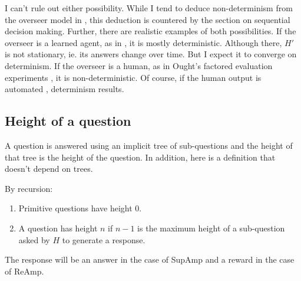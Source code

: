 \documentclass{farlamp}
\begin{document}
I can't rule out either possibility. While I tend to deduce non-determinism from
the overseer model in \textcite{ChriRelAmp}, this deduction is countered by the
section on sequential decision making. Further, there are realistic examples of
both possibilities. If the overseer is a learned agent, as in
\textcite{CSASupAmp}, it is mostly deterministic. Although there, $H'$ is not
stationary, ie. its answers change over time. But I expect it to converge on
determinism. If the overseer is a human, as in Ought's factored evaluation
experiments \parencite{StuhDelCog}, it is non-deterministic. Of course, if the
human output is automated \parencite[see][sec. ‘Caching’ f.]{StuhTaxCapAmp},
determinism results.

%
%
%
%


\subsection{Height of a question}

A question is answered using an implicit tree of sub-questions and the height of
that tree is the height of the question. In addition, here is a definition that
doesn't depend on trees.

\begin{definition} By recursion:
    \begin{enumerate}
    \item Primitive questions have height 0.
    \item A question has height $n$ if $n-1$ is the maximum height of a
        sub-question asked by $H$ to generate a response.
    \end{enumerate}
The response will be an answer in the case of SupAmp and a reward in the case of
ReAmp.
\end{definition}
\end{document}
